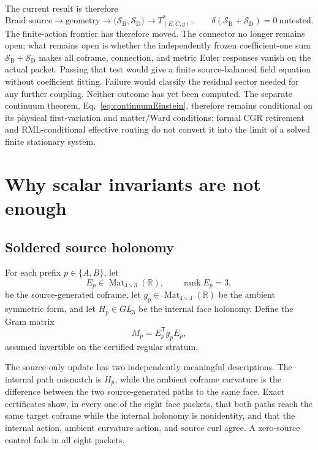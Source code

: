 \documentclass[11pt]{article}
\theoremstyle{definition}
\theoremstyle{remark}
\newcommand{\rank}{\operatorname{rank}}
\begin{document}
The current result is therefore
\begin{equation}\label{eq:frontier}
 \boxed{
 \text{Braid source}\to\text{geometry}
 \to\bigl(\mathcal S_{\mathrm B},\mathcal S_{\mathrm D}\bigr)
 \to T^*_{(E,C,g)},
 \qquad
 \delta\!\left(\mathcal S_{\mathrm B}+\mathcal S_{\mathrm D}\right)=0
 \ \text{untested}.}
\end{equation}
The finite-action frontier has therefore moved. The connector no longer remains open; what remains open is whether the independently frozen coefficient-one sum $\mathcal S_{\mathrm B}+\mathcal S_{\mathrm D}$ makes all coframe, connection, and metric Euler responses vanish on the actual packet. Passing that test would give a finite source-balanced field equation without coefficient fitting. Failure would classify the residual sector needed for any further coupling. Neither outcome has yet been computed. The separate continuum theorem, Eq.~\eqref{eq:continuumEinstein}, therefore remains conditional on its physical first-variation and matter/Ward conditions; formal CGR retirement and RML-conditional effective routing do not convert it into the limit of a solved finite stationary system.

\section{Why scalar invariants are not enough}

\subsection{Soldered source holonomy}

For each prefix $p\in\{A,B\}$, let
\[
 E_p\in\operatorname{Mat}_{4\times3}(\mathbb R),\qquad
 \rank E_p=3,
\]
be the source-generated coframe, let $g_p\in\operatorname{Mat}_{4\times4}(\mathbb R)$ be the ambient symmetric form, and let $H_p\in GL_3$ be the internal face holonomy. Define the Gram matrix
\begin{equation}\label{eq:gram}
 M_p=E_p^{\mathsf T}g_pE_p,
\end{equation}
assumed invertible on the certified regular stratum.

The source-only update has two independently meaningful descriptions. The internal path mismatch is $H_p$, while the ambient coframe curvature is the difference between the two source-generated paths to the same face. Exact certificates show, in every one of the eight face packets, that both paths reach the same target coframe while the internal holonomy is nonidentity, and that the internal action, ambient curvature action, and source curl agree. A zero-source control fails in all eight packets.
\end{document}

